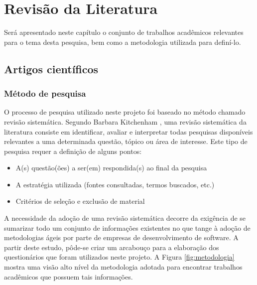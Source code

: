 \chapter{Revisão da Literatura}

Será apresentado neste capítulo o conjunto de trabalhos acadêmicos relevantes para o tema desta pesquisa, bem como a metodologia utilizada para definí-lo.

\section{Artigos científicos}

\subsection{Método de pesquisa}

O processo de pesquisa utilizado neste projeto foi baseado no método chamado revisão sistemática. Segundo Barbara Kitchenham \cite{Barbara04}, uma revisão sistemática da literatura consiste em identificar, avaliar e interpretar todas pesquisas disponíveis relevantes a uma determinada questão, tópico ou área de interesse. Este tipo de pesquisa requer a definição de alguns pontos:

\begin{itemize}
	\item A(s) questão(ões) a ser(em) respondida(s) ao final da pesquisa
	\item A estratégia utilizada (fontes consultadas, termos buscados, etc.)
	\item Critérios de seleção e exclusão de material
\end{itemize}

A necessidade da adoção de uma revisão sistemática decorre da exigência de se sumarizar todo um conjunto de informações existentes no que tange à adoção de metodologias ágeis por parte de empresas de desenvolvimento de software. A partir deste estudo, pôde-se criar um arcabouço para a elaboração dos questionários que foram utilizados neste projeto. A Figura \ref{fig:metodologia} mostra uma visão alto nível da metodologia adotada para encontrar trabalhos acadêmicos que possuem tais informações.

